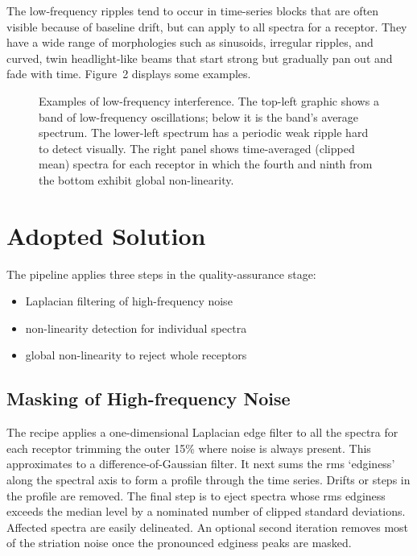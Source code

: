The low-frequency ripples tend to occur in time-series blocks that are often visible because of baseline drift, but can apply to all spectra for a receptor. They have a wide range of morphologies such as sinusoids, irregular ripples, and curved, twin headlight-like beams that start strong but gradually pan out and fade with time.  Figure~2 displays some examples.


\begin{figure}[!ht]
\caption{Examples of low-frequency interference.  The top-left graphic shows a band of low-frequency oscillations; below it is the band's average spectrum.  The lower-left spectrum has a periodic weak ripple hard to detect visually.  The right panel shows time-averaged (clipped mean) spectra for each receptor in which the fourth and ninth from the bottom exhibit global non-linearity.}
\end{figure}

\section{Adopted Solution}

The pipeline applies three steps in the quality-assurance stage: 
\begin{itemize}
\item {}Laplacian filtering of high-frequency noise
\item non-linearity detection for individual spectra
\item global non-linearity to reject whole receptors
\end{itemize}

\subsection{Masking of High-frequency Noise}
 
The recipe applies a one-dimensional Laplacian edge filter to all the spectra for each receptor trimming the outer 15\% where noise is always present.  This approximates to a difference-of-Gaussian filter. It next sums the rms `edginess' along the spectral axis to form a profile through the time series.  Drifts or steps in the profile are removed.  The final step is to eject spectra whose rms edginess exceeds the median level by a nominated number of clipped standard deviations.  Affected spectra are easily delineated.  An optional second iteration removes most of the striation noise once the pronounced edginess peaks are masked.


